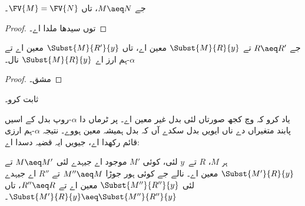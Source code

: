 \documentclass[../../../include/open-logic-section]{subfiles}
\begin{document}
\begin{thm}
  جے $M \aeq N$، تاں $\FV{M} = \FV{N}$۔
\end{thm}

\begin{proof}
   توں سیدھا ملدا اے۔
\end{proof}

\begin{lem}
  جے $R \aeq R'$ تے $\Subst{M}{R}{y}$ معین اے، تاں
  $\Subst{M}{R'}{y}$ معین اے تے $\alpha$-ہم ارز اے
  $\Subst{M}{R}{y}$ نال۔
\end{lem}

\begin{proof}
  مشق۔
\end{proof}

\begin{prob}
   ثابت کرو۔
\end{prob}

یاد کرو کہ  وچ کجھ صورتاں لئی بدل غیر معین اے۔
پر ٹرماں دا $\alpha$-روپ بدل کے اسیں پابند متغیراں دے ناں
ایویں بدل سکدے آں کہ بدل ہمیشہ معین ہووے۔ نتیجہ $\alpha$-ہم ارزی
قائم رکھدا اے، جیویں ایہ قضیہ دسدا اے:

\begin{thm}
  ہر $M$، $R$ تے~$y$ لئی، کوئی $M'$ موجود اے جیہدے لئی $M \aeq M'$
  تے $\Subst{M'}{R}{y}$ معین اے۔ نالے جے کوئی ہور جوڑا
  $M'' \aeq M$ تے $R''$ اے جیہدے لئی $\Subst{M''}{R''}{y}$
  معین اے تے $R'' \aeq R$، تاں $\Subst{M'}{R}{y} \aeq \Subst{M''}{R''}{y}$۔
\end{thm}
\end{document}
